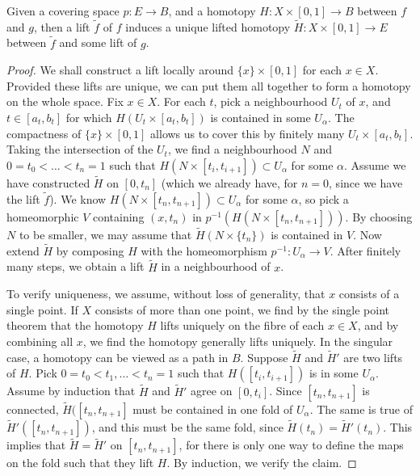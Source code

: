 \begin{theorem}
    Given a covering space $p: E \to B$, and a homotopy $H: X \times [0,1] \to B$ between $f$ and $g$, then a lift $\tilde{f}$ of $f$ induces a unique lifted homotopy $\tilde{H}: X \times [0,1] \to E$ between $\tilde{f}$ and some lift of $g$.
\end{theorem}
\begin{proof}
    We shall construct a lift locally around $\{ x \} \times [0,1]$ for each $x \in X$. Provided these lifts are unique, we can put them all together to form a homotopy on the whole space. Fix $x \in X$. For each $t$, pick a neighbourhood $U_t$ of $x$, and $t \in [a_t, b_t]$ for which $H(U_t \times [a_t, b_t])$ is contained in some $U_\alpha$. The compactness of $\{ x \} \times [0,1]$ allows us to cover this by finitely many $U_t \times [a_t, b_t]$. Taking the intersection of the $U_t$, we find a neighbourhood $N$ and $0 = t_0 < \dots < t_n = 1$ such that $H(N \times [t_i, t_{i+1}]) \subset U_\alpha$ for some $\alpha$. Assume we have constructed $\tilde{H}$ on $[0,t_n]$ (which we already have, for $n = 0$, since we have the lift $\tilde{f}$). We know $H(N \times [t_n, t_{n+1}]) \subset U_\alpha$ for some $\alpha$, so pick a homeomorphic $V$ containing $(x,t_n)$ in $p^{-1}(H(N \times [t_n, t_{n+1}]))$. By choosing $N$ to be smaller, we may assume that $\tilde{H}(N \times \{ t_n \})$ is contained in $V$. Now extend $\tilde{H}$ by composing $H$ with the homeomorphism $p^{-1}: U_\alpha \to V$. After finitely many steps, we obtain a lift $\tilde{H}$ in a neighbourhood of $x$.

    To verify uniqueness, we assume, without loss of generality, that $x$ consists of a single point. If $X$ consists of more than one point, we find by the single point theorem that the homotopy $H$ lifts uniquely on the fibre of each $x \in X$, and by combining all $x$, we find the homotopy generally lifts uniquely. In the singular case, a homotopy can be viewed as a path in $B$. Suppose $\tilde{H}$ and $\tilde{H}'$ are two lifts of $H$. Pick $0 = t_0 < t_1, \dots < t_n = 1$ such that $H([t_i, t_{i+1}])$ is in some $U_\alpha$. Assume by induction that $\tilde{H}$ and $\tilde{H}'$ agree on $[0,t_i]$. Since $[t_n, t_{n+1}]$ is connected, $\tilde{H}([t_n, t_{n+1}]$ must be contained in one fold of $U_\alpha$. The same is true of $\tilde{H}'([t_n, t_{n+1}])$, and this must be the same fold, since $\tilde{H}(t_n) = \tilde{H}'(t_n)$. This implies that $\tilde{H} = \tilde{H}'$ on $[t_n, t_{n+1}]$, for there is only one way to define the maps on the fold such that they lift $H$. By induction, we verify the claim.
\end{proof}

